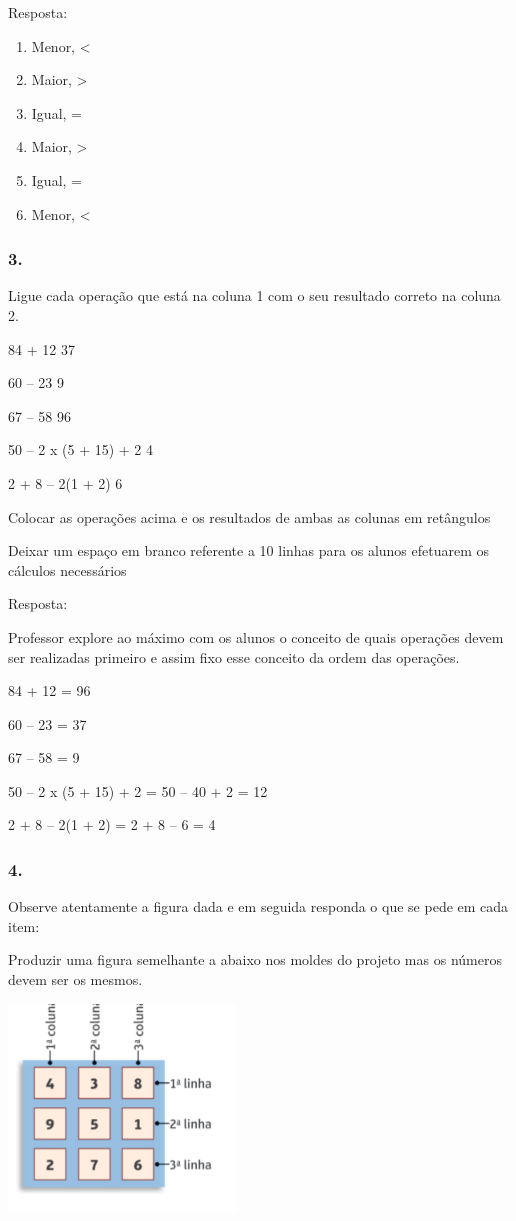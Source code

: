 Resposta:

\begin{enumerate}
\def\labelenumi{\alph{enumi})}
\item
  Menor, \textless{}
\item
  Maior, \textgreater{}
\item
  Igual, =
\item
  Maior, \textgreater{}
\item
  Igual, =
\item
  Menor, \textless{}
\end{enumerate}

\subsubsection{3.}\label{section-18}

Ligue cada operação que está na coluna 1 com o seu resultado correto na
coluna 2.

84 + 12 37

60 -- 23 9

67 -- 58 96

50 -- 2 x (5 + 15) + 2 4

2 + 8 -- 2(1 + 2) 6

Colocar as operações acima e os resultados de ambas as colunas em
retângulos

Deixar um espaço em branco referente a 10 linhas para os alunos
efetuarem os cálculos necessários

Resposta:

Professor explore ao máximo com os alunos o conceito de quais operações
devem ser realizadas primeiro e assim fixo esse conceito da ordem das
operações.

84 + 12 = 96

60 -- 23 = 37

67 -- 58 = 9

50 -- 2 x (5 + 15) + 2 = 50 -- 40 + 2 = 12

2 + 8 -- 2(1 + 2) = 2 + 8 -- 6 = 4

\subsubsection{4.}\label{section-19}

Observe atentamente a figura dada e em seguida responda o que se pede em
cada item:

Produzir uma figura semelhante a abaixo nos moldes do projeto mas os
números devem ser os mesmos.

\includegraphics[width=2.37521in,height=2.18352in]{media/image21.png}

